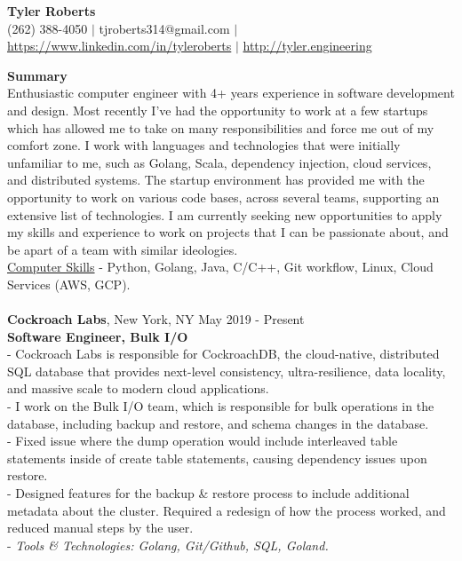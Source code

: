 \documentclass{resume}
\begin{document}
\begin{center}
{\LARGE \bf Tyler Roberts} \\[1mm]
\footnotesize
(262) 388-4050 $|$
tjroberts314@gmail.com $|$
\href{https://www.linkedin.com/in/tyleroberts}{https://www.linkedin.com/in/tyleroberts} $|$
\href{http://tyler.engineering}{http://tyler.engineering}
\end{center}
\begin{flushleft}

{\textbf{\large Summary}} \\
{
\footnotesize
\tab Enthusiastic computer engineer with 4+ years experience in software development and design. Most recently I've had the opportunity to work at a few startups which has allowed me to take on many responsibilities and force me out of my comfort zone. I work with languages and technologies that were initially unfamiliar to me, such as Golang, Scala, dependency injection, cloud services, and distributed systems. The startup environment has provided me with the opportunity to work on various code bases, across several teams, supporting an extensive list of technologies. I am currently seeking new opportunities to apply my skills and experience to work on projects that I can be passionate about, and be apart of a team with similar ideologies. \\[2mm]

}
\underline{Computer Skills} - Python, Golang, Java, C/C++, Git workflow, Linux, Cloud Services (AWS, GCP). \\[5mm]
\\[2mm]

\textbf{Cockroach Labs}, New York, NY \hfill May 2019 - Present\\
\textbf{Software Engineer, Bulk I/O}\\
{\footnotesize
	\ttab - Cockroach Labs is responsible for CockroachDB, the cloud-native, distributed SQL database that provides next-level \ttab consistency, ultra-resilience, data locality, and massive scale to modern cloud applications. \\
	\ttab - I work on the Bulk I/O team, which is responsible for bulk operations in the database, including backup and restore, and \ttab schema changes in the database. \\
	\ttab - Fixed issue where the dump operation would include interleaved table statements inside
	of create table statements, causing \ttab dependency issues upon restore. \\
	\ttab - Designed features for the backup \& restore process to include additional metadata about the cluster. Required a redesign of \ttab how the process worked, and reduced manual steps by the user. \\
	\ttab- \textit{Tools \& Technologies: Golang, Git/Github, SQL, Goland.}\\[3mm]
}


\end{flushleft}
\end{document}
